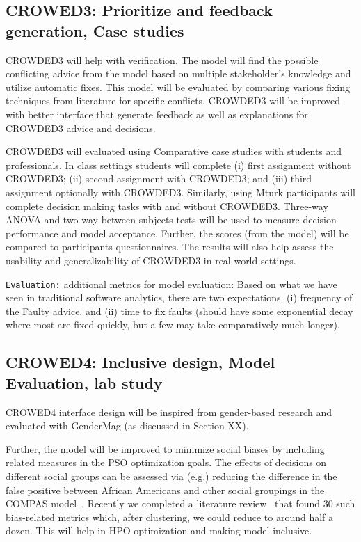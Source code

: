 \subsection{CROWED3: Prioritize and feedback generation, Case studies}
CROWDED3 will help with verification. The model will find the possible conflicting advice from the model based on multiple stakeholder's knowledge and utilize automatic fixes. This model will be evaluated by comparing various fixing techniques from literature for specific conflicts. CROWDED3 will be improved with better interface that generate feedback as well as explanations for CROWDED3 advice and decisions.

CROWDED3 will evaluated using Comparative case studies with students and professionals. In class settings students will complete (i) first assignment without CROWDED3; (ii) second assignment with CROWDED3; and (iii) third assignment optionally with CROWDED3.  Similarly, using Mturk participants will complete decision making tasks with and without CROWDED3. Three-way ANOVA and two-way between-subjects tests will be used to measure decision performance and model acceptance. Further, the scores (from the model) will be compared to participants questionnaires. The results will also help assess the usability and generalizability of CROWDED3 in real-world settings. 

{\tt Evaluation:} additional metrics for model evaluation: Based on what we have seen in traditional software analytics, there are two expectations. (i) frequency of the Faulty advice, and (ii) time to fix faults (should have some exponential decay where most are fixed quickly, but a few may take comparatively much longer).

\subsection{CROWED4: Inclusive design, Model Evaluation, lab study}

CROWED4 interface design will be inspired from gender-based research and evaluated with GenderMag (as discussed in Section XX). 

Further, the model will be improved to minimize social biases by including related measures in the PSO optimization goals. The effects of decisions on different social groups can be assessed via (e.g.) reducing the difference in the false positive between African Americans and other social groupings in the COMPAS model~\cite{Machine_Bias}. Recently we completed a literature review~\cite{Majumder21} that found 30 such bias-related metrics which, after   clustering, we could reduce to around half a dozen. This will help in HPO optimization and making model inclusive.

